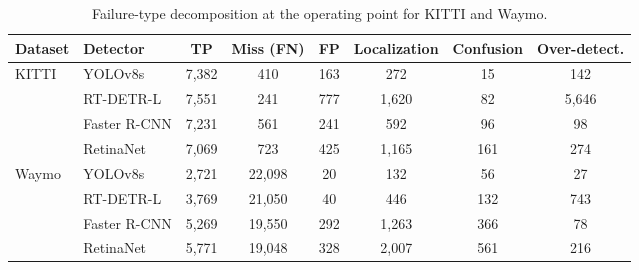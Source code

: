 \begin{table}[t]
    \centering
    \caption{Failure-type decomposition at the operating point for KITTI and Waymo.}
    \label{tab:failure_type}
    \begin{tabular}{llcccccc}
        \toprule
        Dataset & Detector & TP & Miss (FN) & FP & Localization & Confusion & Over-detect. \\
        \midrule
        KITTI & YOLOv8s & 7,382 & 410 & 163 & 272 & 15 & 142 \\
         & RT-DETR-L & 7,551 & 241 & 777 & 1,620 & 82 & 5,646 \\
         & Faster R-CNN & 7,231 & 561 & 241 & 592 & 96 & 98 \\
         & RetinaNet & 7,069 & 723 & 425 & 1,165 & 161 & 274 \\
        \addlinespace
        Waymo & YOLOv8s & 2,721 & 22,098 & 20 & 132 & 56 & 27 \\
         & RT-DETR-L & 3,769 & 21,050 & 40 & 446 & 132 & 743 \\
         & Faster R-CNN & 5,269 & 19,550 & 292 & 1,263 & 366 & 78 \\
         & RetinaNet & 5,771 & 19,048 & 328 & 2,007 & 561 & 216 \\
        \bottomrule
    \end{tabular}
\end{table}
